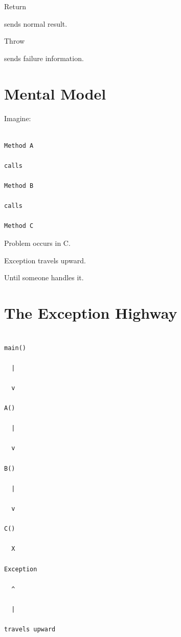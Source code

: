 \documentclass[11pt,a4paper]{book}
\begin{document}
Return


sends normal result.


Throw


sends failure information.


\section{Mental Model}

Imagine:

\begin{verbatim}

Method A

calls

Method B

calls

Method C

\end{verbatim}


Problem occurs in C.


Exception travels upward.


Until someone handles it.


\section{The Exception Highway}

\begin{verbatim}

main()

  |

  v

A()

  |

  v

B()

  |

  v

C()

  X

Exception

  ^

  |

travels upward

\end{verbatim}
\end{document}
